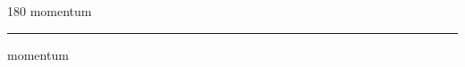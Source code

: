 
\begin{frame}
\begin{center}
\begin{turn}{180}
{\fontsize{2.5cm}{1em}\selectfont momentum}
\end{turn}
\vspace{1em}\par  
\hrule
\vspace{1em}\par  
{\fontsize{2.5cm}{1em}\selectfont momentum}
\end{center}
\end{frame}
